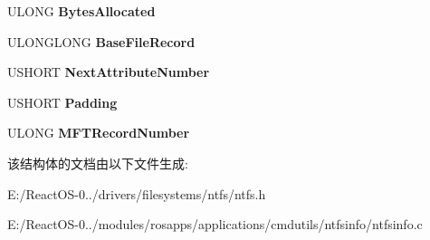 \begin{DoxyCompactItemize}
U\+L\+O\+NG {\bfseries Bytes\+Allocated}
\item 
\mbox{\label{struct___f_i_l_e___r_e_c_o_r_d___h_e_a_d_e_r_aabde5113f6082f9901ebc0a6403acfba}} 
U\+L\+O\+N\+G\+L\+O\+NG {\bfseries Base\+File\+Record}
\item 
\mbox{\label{struct___f_i_l_e___r_e_c_o_r_d___h_e_a_d_e_r_a64ed7607e3c95b14aaf4e40c9087c9c2}} 
U\+S\+H\+O\+RT {\bfseries Next\+Attribute\+Number}
\item 
\mbox{\label{struct___f_i_l_e___r_e_c_o_r_d___h_e_a_d_e_r_a68c459e3c14d52c37e41b7bd9ec4dc23}} 
U\+S\+H\+O\+RT {\bfseries Padding}
\item 
\mbox{\label{struct___f_i_l_e___r_e_c_o_r_d___h_e_a_d_e_r_a75a4edaf7dda540534e8ee6ccbe4ee6f}} 
U\+L\+O\+NG {\bfseries M\+F\+T\+Record\+Number}
\end{DoxyCompactItemize}


该结构体的文档由以下文件生成\+:\begin{DoxyCompactItemize}
\item 
E\+:/\+React\+O\+S-\/0../drivers/filesystems/ntfs/ntfs.\+h\item 
E\+:/\+React\+O\+S-\/0../modules/rosapps/applications/cmdutils/ntfsinfo/ntfsinfo.\+c\end{DoxyCompactItemize}

